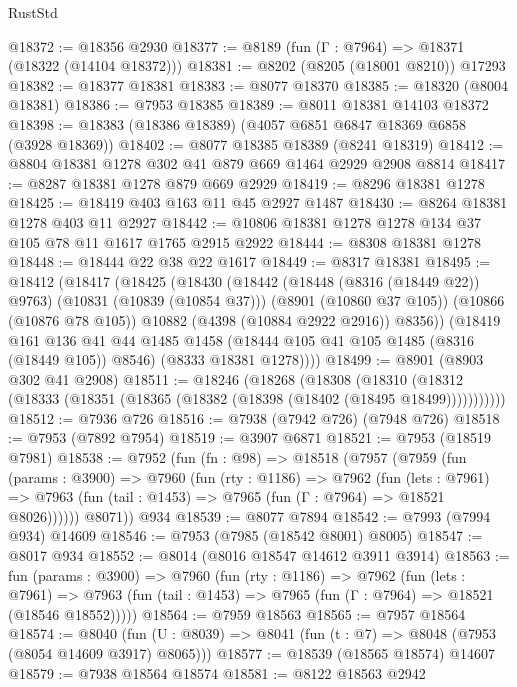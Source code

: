 \begin{lexlean}{RustStd}
\begin{coremodule}
@18372 := @18356 @2930
@18377 := @8189 (fun (Γ : @7964) => @18371 (@18322 (@14104 @18372)))
@18381 := @8202 (@8205 (@18001 @8210)) @17293
@18382 := @18377 @18381
@18383 := @8077 @18370
@18385 := @18320 (@8004 @18381)
@18386 := @7953 @18385
@18389 := @8011 @18381 @14103 @18372
@18398 := @18383 (@18386 @18389) (@4057 @6851 @6847 @18369 @6858 (@3928 @18369))
@18402 := @8077 @18385 @18389 (@8241 @18319)
@18412 := @8804 @18381 @1278 @302 @41 @879 @669 @1464 @2929 @2908 @8814
@18417 := @8287 @18381 @1278 @879 @669 @2929
@18419 := @8296 @18381 @1278
@18425 := @18419 @403 @163 @11 @45 @2927 @1487
@18430 := @8264 @18381 @1278 @403 @11 @2927
@18442 := @10806 @18381 @1278 @1278 @134 @37 @105 @78 @11 @1617 @1765 @2915 @2922
@18444 := @8308 @18381 @1278
@18448 := @18444 @22 @38 @22 @1617
@18449 := @8317 @18381
@18495 := @18412
    (@18417
      (@18425
        (@18430
          (@18442
            (@18448 (@8316 (@18449 @22)) @9763)
            (@10831 (@10839 (@10854 @37)))
            (@8901 (@10860 @37 @105))
            (@10866 (@10876 @78 @105))
            @10882
            (@4398 (@10884 @2922 @2916))
            @8356))
        (@18419
          @161
          @136
          @41
          @44
          @1485
          @1458
          (@18444 @105 @41 @105 @1485 (@8316 (@18449 @105)) @8546)
          (@8333 @18381 @1278))))
@18499 := @8901 (@8903 @302 @41 @2908)
@18511 := @18246
    (@18268
      (@18308
        (@18310 (@18312 (@18333 (@18351 (@18365 (@18382 (@18398 (@18402 (@18495 @18499)))))))))))
@18512 := @7936 @726
@18516 := @7938 (@7942 @726) (@7948 @726)
@18518 := @7953 (@7892 @7954)
@18519 := @3907 @6871
@18521 := @7953 (@18519 @7981)
@18538 := @7952
    (fun (fn : @98) =>
    @18518
      (@7957
        (@7959
          (fun (params : @3900) =>
          @7960
            (fun (rty : @1186) =>
            @7962
              (fun (lets : @7961) =>
              @7963 (fun (tail : @1453) => @7965 (fun (Γ : @7964) => @18521 @8026))))))
        @8071))
    @934
@18539 := @8077 @7894
@18542 := @7993 (@7994 @934) @14609
@18546 := @7953 (@7985 (@18542 @8001) @8005)
@18547 := @8017 @934
@18552 := @8014 (@8016 @18547 @14612 @3911 @3914)
@18563 := fun (params : @3900) =>
  @7960
    (fun (rty : @1186) =>
    @7962
      (fun (lets : @7961) =>
      @7963 (fun (tail : @1453) => @7965 (fun (Γ : @7964) => @18521 (@18546 @18552)))))
@18564 := @7959 @18563
@18565 := @7957 @18564
@18574 := @8040
    (fun (U : @8039) => @8041 (fun (t : @7) => @8048 (@7953 (@8054 @14609 @3917) @8065)))
@18577 := @18539 (@18565 @18574) @14607
@18579 := @7938 @18564 @18574
@18581 := @8122 @18563 @2942

\end{coremodule}
\end{lexlean}

